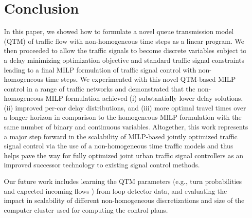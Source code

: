 \section{Conclusion}

In this paper, we showed how to formulate a novel queue transmission model (QTM)
of traffic flow with non-homogeneous time steps as a linear program.  We
then proceeded to allow the traffic signals to become discrete variables subject
to a delay minimizing optimization objective and standard traffic signal
constraints leading to a final MILP formulation of traffic signal control with
non-homogeneous time steps.  We
experimented with this novel QTM-based MILP control in a range of traffic networks
and demonstrated that the non-homogeneous MILP formulation
achieved (i) substantially lower delay solutions, (ii) improved per-car delay distributions,
and (iii) more optimal travel times over a longer horizon 
in comparison to the homogeneous MILP formulation with the same number of binary
and continuous variables.
Altogether, this work represents a
major step forward in the scalability of MILP-based jointly optimized traffic
signal control via the use of a non-homogeneous time traffic models and thus helps
pave the way for fully optimized joint urban traffic signal controllers as an
improved successor technology to existing signal control methods.


Our future work includes learning the QTM parameters (e.g., turn probabilities
 and expected incoming flows ) from loop detector data,
and evaluating the impact in scalability of different non-homogeneous
discretizations and size of the computer cluster used for computing the control
plans. 
